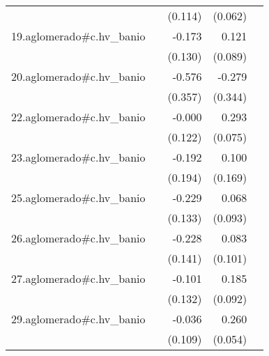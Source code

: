 {\begin{longtable}{l*{4}{D{.}{.}{-1}}}
            &                     &     (0.114)         &     (0.062)         &                     \\
\addlinespace
19.aglomerado#c.hv\_banio&                     &      -0.173         &       0.121         &                     \\
            &                     &     (0.130)         &     (0.089)         &                     \\
\addlinespace
20.aglomerado#c.hv\_banio&                     &      -0.576         &      -0.279         &                     \\
            &                     &     (0.357)         &     (0.344)         &                     \\
\addlinespace
22.aglomerado#c.hv\_banio&                     &      -0.000         &       0.293\sym{***}&                     \\
            &                     &     (0.122)         &     (0.075)         &                     \\
\addlinespace
23.aglomerado#c.hv\_banio&                     &      -0.192         &       0.100         &                     \\
            &                     &     (0.194)         &     (0.169)         &                     \\
\addlinespace
25.aglomerado#c.hv\_banio&                     &      -0.229         &       0.068         &                     \\
            &                     &     (0.133)         &     (0.093)         &                     \\
\addlinespace
26.aglomerado#c.hv\_banio&                     &      -0.228         &       0.083         &                     \\
            &                     &     (0.141)         &     (0.101)         &                     \\
\addlinespace
27.aglomerado#c.hv\_banio&                     &      -0.101         &       0.185\sym{*}  &                     \\
            &                     &     (0.132)         &     (0.092)         &                     \\
\addlinespace
29.aglomerado#c.hv\_banio&                     &      -0.036         &       0.260\sym{***}&                     \\
            &                     &     (0.109)         &     (0.054)         &                     \\

\end{longtable}}

